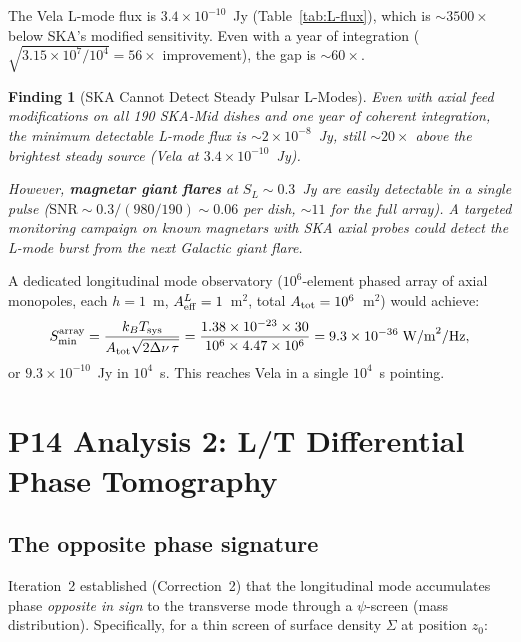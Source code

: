 \documentclass[11pt]{article}
\newtheorem{finding}{Finding}
\newcommand{\ee}[1]{\times 10^{#1}}
\begin{document}
The Vela L-mode flux is $3.4\ee{-10}$~Jy (Table~\ref{tab:L-flux}),
which is $\sim 3500\times$ below SKA's modified sensitivity. Even
with a year of integration ($\sqrt{3.15\ee{7}/10^4} = 56\times$
improvement), the gap is $\sim 60\times$.

\begin{finding}[SKA Cannot Detect Steady Pulsar L-Modes]
\label{find:ska-no}
Even with axial feed modifications on all 190 SKA-Mid dishes and
one year of coherent integration, the minimum detectable L-mode flux
is $\sim 2\ee{-8}$~Jy, still $\sim 20\times$ above the brightest
steady source (Vela at $3.4\ee{-10}$~Jy).

However, \textbf{magnetar giant flares} at $S_L \sim 0.3$~Jy are
easily detectable in a single pulse ($\text{SNR} \sim 0.3/(980/190)
\sim 0.06$ per dish, $\sim 11$ for the full array). A targeted
monitoring campaign on known magnetars with SKA axial probes could
detect the L-mode burst from the next Galactic giant flare.
\end{finding}

A dedicated longitudinal mode observatory ($10^6$-element phased
array of axial monopoles, each $h = 1$~m, $A_{\rm eff}^L = 1$~m$^2$,
total $A_{\rm tot} = 10^6$~m$^2$) would achieve:
\begin{equation}
S_{\rm min}^{\rm array} = \frac{k_B T_{\rm sys}}{A_{\rm tot}
\sqrt{2\Delta\nu\,\tau}}
= \frac{1.38\ee{-23} \times 30}{10^6 \times 4.47\ee{6}}
= 9.3\ee{-36}\;\text{W/m}^2/\text{Hz},
\end{equation}
or $9.3\ee{-10}$~Jy in $10^4$~s. This reaches Vela in a single
$10^4$~s pointing.

\section{P14 Analysis 2: L/T Differential Phase Tomography}
\label{sec:tomography}

\subsection{The opposite phase signature}

Iteration~2 established (Correction~2) that the longitudinal mode
accumulates phase \textit{opposite in sign} to the transverse mode
through a $\psi$-screen (mass distribution). Specifically, for a
thin screen of surface density $\Sigma$ at position $z_0$:
\end{document}
